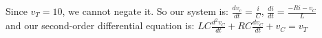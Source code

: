 \documentclass[preview]{standalone}
\begin{document}
\begin{center}
\raggedright
                    Since $v_T = 10$, we cannot negate it. So our system is:
                    $\frac{dv_c}{dt} = \frac{i}{C}$, $\frac{di}{dt} = \frac{-Ri - v_C}{L}$ \\
                    and our
                    second-order differential equation is: 
                    $ LC\frac{d^2v_C}{dt} + RC\frac{dv_C}{dt} + v_C = v_T $
\end{center}
\end{document}
